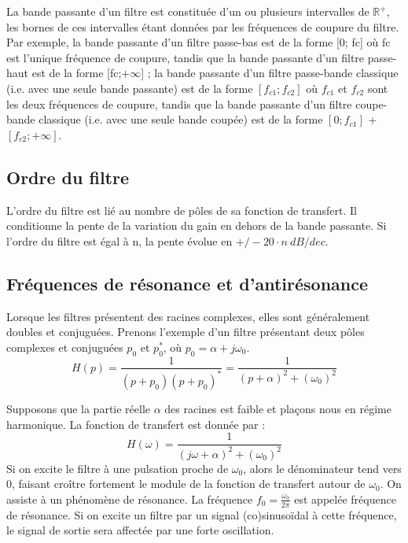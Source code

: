 	La bande passante d’un filtre est constituée d’un ou plusieurs intervalles de $\mathbb{R}^{+}$, les bornes de ces intervalles étant données par les fréquences de coupure du filtre. Par exemple, la bande passante d’un filtre passe-bas est de la forme [0; fc] où fc est l’unique fréquence de coupure, tandis que la bande passante d’un filtre passe-haut est de la forme [fc;$+\infty$] ; la bande passante d’un filtre passe-bande classique (i.e. avec une seule bande passante) est de la forme $[f_{c1}; f_{c2}]$ où $f_{c1}$ et $f_{c2}$ sont les deux fréquences de coupure, tandis que la bande passante d’un filtre coupe-bande classique (i.e. avec une seule bande coupée) est de la forme $[0;f_{c1}]$ + $[f_{c2};+\infty]$.
	
	\subsection{Ordre du filtre}
	L'ordre du filtre est lié au nombre de pôles de sa fonction de transfert. Il conditionne la pente de la variation du gain en dehors de la bande passante. Si l'ordre du filtre est égal à n, la pente évolue en $+/-20\cdot n~dB/dec$.
	
	\subsection{Fréquences de résonance et d'antirésonance}
	Lorsque les filtres présentent des racines complexes, elles sont généralement doubles et conjuguées.	Prenons l'exemple d'un filtre présentant deux pôles complexes et conjuguées $p_{0}$ et $p_{0}^{*}$, où $p_{0}=\alpha+j\omega_{0}$.
	\begin{equation*}
	H(p)=\frac{1}{(p+p_{0})(p+p_{0})^{*}}=\frac{1}{(p+\alpha)^{2}+(\omega_{0})^{2}}
	\end{equation*}
	
	Supposons que la partie réelle $\alpha$ des racines est faible et plaçons nous en régime harmonique. La fonction de transfert est donnée par :
	\begin{equation*}
	H(\omega)=\frac{1}{(j\omega+\alpha)^{2}+(\omega_{0})^{2}}
	\end{equation*}
	Si on excite le filtre à une pulsation proche de $\omega_{0}$, alors le dénominateur tend vers 0, faisant croître fortement le module de la fonction de transfert autour de $\omega_{0}$. On assiste à un phénomène de résonance. La fréquence $f_{0}=\frac{\omega_{0}}{2\pi}$ est appelée fréquence de résonance. Si on excite un filtre par un signal (co)sinusoïdal à cette fréquence, le signal de sortie sera affectée par une forte oscillation.
	

